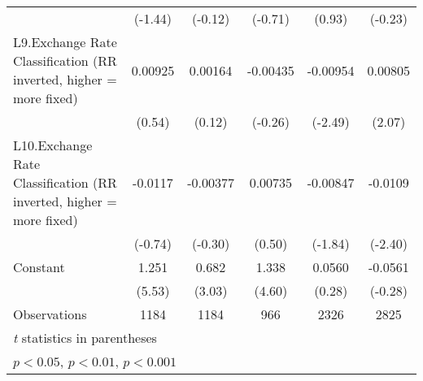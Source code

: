 {\begin{longtable}{l*{5}{c}}
                &  (-1.44)         &  (-0.12)         &  (-0.71)         &   (0.93)         &  (-0.23)         \\
\addlinespace
L9.Exchange Rate Classification (RR inverted, higher = more fixed)&  0.00925         &  0.00164         & -0.00435         & -0.00954\sym{*}  &  0.00805\sym{*}  \\
                &   (0.54)         &   (0.12)         &  (-0.26)         &  (-2.49)         &   (2.07)         \\
\addlinespace
L10.Exchange Rate Classification (RR inverted, higher = more fixed)&  -0.0117         & -0.00377         &  0.00735         & -0.00847         &  -0.0109\sym{*}  \\
                &  (-0.74)         &  (-0.30)         &   (0.50)         &  (-1.84)         &  (-2.40)         \\
\addlinespace
Constant        &    1.251\sym{***}&    0.682\sym{**} &    1.338\sym{***}&   0.0560         &  -0.0561         \\
                &   (5.53)         &   (3.03)         &   (4.60)         &   (0.28)         &  (-0.28)         \\
\midrule
Observations    &     1184         &     1184         &      966         &     2326         &     2825         \\
\bottomrule
\multicolumn{6}{l}{\footnotesize \textit{t} statistics in parentheses}\\
\multicolumn{6}{l}{\footnotesize \sym{*} \(p<0.05\), \sym{**} \(p<0.01\), \sym{***} \(p<0.001\)}\\
\end{longtable}
}
